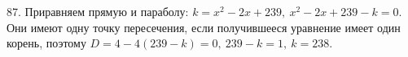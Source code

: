 87. Приравняем прямую и параболу: $k=x^2-2x+239,\ x^2-2x+239-k=0.$ Они имеют одну точку пересечения, если получившееся уравнение имеет один корень, поэтому $D=4-4(239-k)=0,\ 239-k=1,\ k=238.$\\
